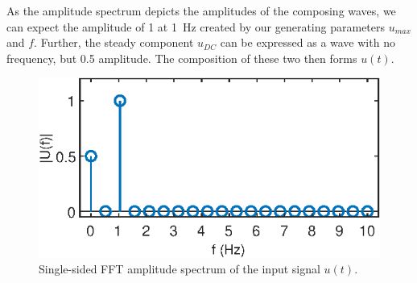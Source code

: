 As the amplitude spectrum depicts the amplitudes of the composing waves, we can expect the amplitude of 1 at \SI{1}{Hz} created by our generating parameters $u_{max}$ and $f$. Further, the steady component $u_{DC}$ can be expressed as a wave with no frequency, but 0.5 amplitude. The composition of these two then forms $u(t)$.

\begin{figure}[h] 
  \centering
  \includegraphics[scale=1]{ue1/amp_fft.eps} %
  \caption{Single-sided FFT amplitude spectrum of the input signal $u(t)$.}
  \label{fig:amp_fft}
\end{figure}

\clearpage
